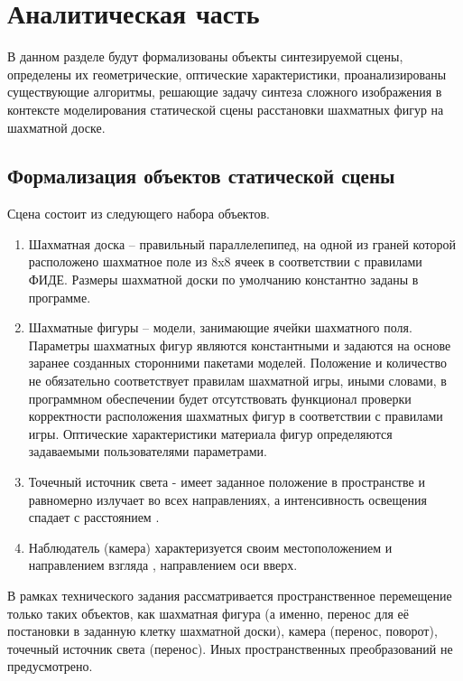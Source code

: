 \chapter{Аналитическая часть}

В данном разделе будут формализованы объекты синтезируемой сцены, определены их геометрические, оптические характеристики, проанализированы существующие алгоритмы, решающие задачу синтеза сложного изображения в контексте моделирования статической сцены расстановки шахматных фигур на шахматной доске.

\section{Формализация объектов статической сцены}

Сцена состоит из следующего набора объектов.

\begin{enumerate}
	\item Шахматная доска – правильный параллелепипед, на одной из граней которой расположено шахматное поле из 8x8 ячеек в соответствии с правилами ФИДЕ. Размеры шахматной доски по умолчанию константно заданы в программе.
	\item Шахматные фигуры – модели, занимающие ячейки шахматного поля. Параметры шахматных фигур являются константными и задаются на основе заранее созданных сторонними пакетами моделей. Положение и количество не обязательно соответствует правилам шахматной игры, иными словами, в программном обеспечении будет отсутствовать функционал проверки корректности расположения шахматных фигур в соответствии с правилами игры. Оптические характеристики материала фигур определяются задаваемыми пользователями параметрами.
	\item Точечный источник света - имеет заданное положение в пространстве и равномерно излучает во всех направлениях, а интенсивность освещения спадает с расстоянием \cite{kurov:2023}. 
	\item Наблюдатель (камера) характеризуется своим местоположением и направлением взгляда \cite{kurov:2023}, направлением оси вверх.
\end{enumerate}

В рамках технического задания рассматривается пространственное перемещение только таких объектов, как шахматная фигура (а именно, перенос для её постановки в заданную клетку шахматной доски), камера (перенос, поворот), точечный источник света (перенос). Иных пространственных преобразований не предусмотрено.

